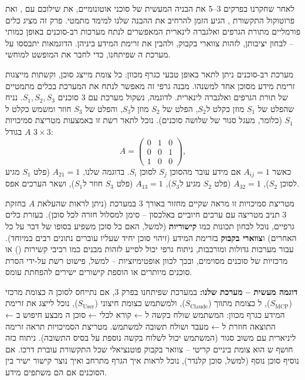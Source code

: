 
לאחר שחקרנו בפרקים \num{3}–\num{5} את הבניה המעשית של סוכני  אוטונומיים, את שילובם עם , ואת פרוטוקול התקשורת , הגיע הזמן להרחיב את ההבנה שלנו למימד מתמטי. פרק זה מציג כלים פורמליים מתורת הגרפים ואלגברה לינארית המאפשרים לנתח מערכות רב-סוכנים באופן כמותי – לבחון יציבותן, לזהות צווארי בקבוק, ולהבין את זרימת המידע ביניהן. הדוגמאות יתבססו על מערכת ה שפיתחנו, כדי לחבר את המופשט למוחשי.


מערכת רב-סוכנים ניתן לתאר באופן טבעי כגרף מכוון: כל צומת מייצג סוכן, וקשתות מייצגות זרימת מידע מסוכן אחד למשנהו. מבנה גרפי זה מאפשר לנתח את המערכת בכלים מתמטיים של תורת הגרפים ואלגברה לינארית. לדוגמה, נשקול מערכת עם $\num{3}$ סוכנים $S_1, S_2, S_3$. נניח שהפלט של $S_1$ מוזן כקלט ל\en{-}$S_2$, הפלט של $S_2$ מוזן ל\en{-}$S_3$, והפלט של $S_3$ חוזר ומשמש כקלט ל\en{-}$S_1$ (כלומר, מעגל סגור של שלושה סוכנים). נוכל לתאר רשת זו באמצעות מטריצת סמיכויות $A$ בגודל $\num{3}\times \num{3}$:
\[
A = \begin{pmatrix}
\num{0} & \num{1} & \num{0}\\
\num{0} & \num{0} & \num{1}\\
\num{1} & \num{0} & \num{0}
\end{pmatrix},
\]
כאשר $A_{ij}=\num{1}$ אם מידע עובר מהסוכן $S_j$ לסוכן $S_i$. בדוגמה שלנו, $A_{21}=\num{1}$ (פלט $S_1$ מגיע לסוכן $S_2$), $A_{32}=\num{1}$ (פלט $S_2$ מגיע ל\en{-}$S_3$), $A_{13}=\num{1}$ (פלט $S_3$ חוזר ל\en{-}$S_1$), ושאר הערכים אפס.

מטריצת סמיכויות זו מראה שקיים מחזור באורך \num{3} במערכת (ניתן לראות שהעלאת $A$ בחזקת \num{3} תניב מטריצה עם ערכים חיוביים באלכסון – סימן למסלול חזרה לכל סוכן). בעזרת כלים גרפיים, נוכל לבחון תכונות כמו \textbf{קישוריות} (למשל, האם כל סוכן משפיע בסופו של דבר על כל האחרים) ו\textbf{צווארי בקבוק} בזרימת המידע (זיהוי סוכן יחיד שעליו עוברים נתונים רבים במיוחד). עבור מערכות גדולות ומורכבות, ניתוח גרפי יכול לסייע לזהות מבנים כמו רכיבי קשירות () או מרכזיות של סוכנים מסוימים, ובכך לכוון אופטימיזציות – למשל, פישוט רשת על-ידי הסרת סוכנים מיותרים או הוספת קישורים ישירים להפחתת עומס.

\textbf{דוגמה מעשית – מערכת  שלנו:} במערכת שפיתחנו בפרק \num{3}, אם נתייחס לסוכן ה כצומת מרכזי ($S_{\text{MCP}}$), ל כצומת מתווך ($S_{\text{Claude}}$), ולמשתמש כצומת חיצוני ($S_{\text{User}}$), נוכל לייצג את זרימת המידע כגרף מכוון: המשתמש שולח בקשה ל ←  קורא לכלי  ← סוכן ה מבצע חיפוש ב ← התוצאה חוזרת ל ←  מעבד ושולח תשובה למשתמש. מטריצת הסמיכויות תראה זרימה ליניארית עם משוב סגור (המשתמש יכול לשלוח בקשה נוספת על בסיס התשובה). ניתוח כזה חושף ש הוא צומת ביניים קריטי – צוואר בקבוק פוטנציאלי שכל התקשורת עוברת דרכו. אם נוסיף סוכן נוסף (למשל, סוכן קלנדר), נוכל לראות איך הגרף מתרחב ואיך נוצר קישור ישיר בין הסוכנים אם הם משתפים מידע.

